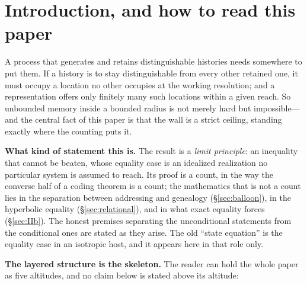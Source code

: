 \documentclass[11pt,reqno]{amsart}
\theoremstyle{plain}
\theoremstyle{definition}
\begin{document}
\section{Introduction, and how to read this paper}

A process that generates and retains distinguishable histories needs somewhere to put them. If a history is to stay distinguishable from every other retained one, it must occupy a location no other occupies at the working resolution; and a representation offers only finitely many such locations within a given reach. So unbounded memory inside a bounded radius is not merely hard but impossible---and the central fact of this paper is that the wall is a strict ceiling, standing exactly where the counting puts it.

\medskip
\noindent\textbf{What kind of statement this is.} The result is a \emph{limit principle}: an inequality that cannot be beaten, whose equality case is an idealized realization no particular system is assumed to reach. Its proof is a count, in the way the converse half of a coding theorem is a count; the mathematics that is not a count lies in the separation between addressing and genealogy (\S\ref{sec:balloon}), in the hyperbolic equality (\S\ref{sec:relational}), and in what exact equality forces (\S\ref{sec:IIb}). The honest premises separating the unconditional statements from the conditional ones are stated as they arise. The old ``state equation'' is the equality case in an isotropic host, and it appears here in that role only.

\medskip
\noindent\textbf{The layered structure is the skeleton.} The reader can hold the whole paper as five altitudes, and no claim below is stated above its altitude:
\end{document}
